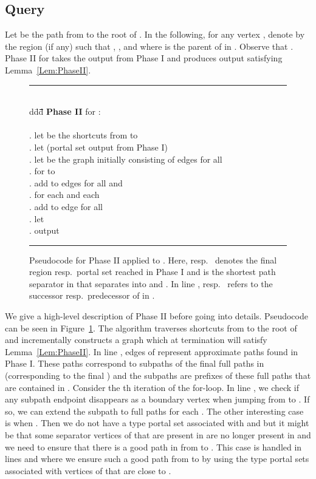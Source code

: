 \documentclass[11pt]{article}
\begin{document}
\subsection{Query}
Let  be the path from  to the root  of . In the following, for any vertex , denote by  the region (if any) such that , , and  where  is the parent of  in . Observe that . Phase II for  takes the output from Phase I and produces output satisfying Lemma~\ref{Lem:PhaseII}.
\begin{figure}[!ht]
\begin{tabbing}
\rule{\linewidth}{\arrayrulewidth}\\
d\=dd\=\quad\=\quad\=\quad\=\quad\=\quad\=\quad\=\quad\=\quad\=\quad\=\quad\=\quad\=\kill
\>\textbf{Phase II} for :\\\\
. \>\>let  be the shortcuts from  to \\
. \>\>let  (portal set output from Phase I)\\
. \>\>let  be the graph initially consisting of edges  for all \\
. \>\>for  to \\
. \>\>\>add to  edges  for all  and \\
. \>\>\>for each  and each \\
. \>\>\>\>add to  edge  for all \\
. \>\>\>let \\
. \>\>output \\
\rule{\linewidth}{\arrayrulewidth}
\end{tabbing}
\caption{Pseudocode for Phase II applied to . Here,  resp.~ denotes the final region resp.~portal set reached in Phase I and  is the shortest path separator in  that separates  into  and . In line ,  resp.~ refers to the successor resp.~predecessor of  in .}\label{fig:PhaseII}
\end{figure}
We give a high-level description of Phase II before going into details.  Pseudocode can be seen in Figure~\ref{fig:PhaseII}. The algorithm traverses shortcuts  from  to the root  of  and incrementally constructs a graph  which at termination will satisfy Lemma~\ref{Lem:PhaseII}. In line , edges of  represent approximate paths found in Phase I. These paths correspond to subpaths of the final full paths in  (corresponding to the final ) and the subpaths are prefixes of these full paths that are contained in . Consider the th iteration of the for-loop. In line , we check if any subpath endpoint  disappears as a boundary vertex when jumping from  to . If so, we can extend the subpath to full paths  for each . The other interesting case is when . Then we do not have a type  portal set associated with  and  but it might be that some separator vertices  of  that are present in  are no longer present in  and we need to ensure that there is a good path in  from  to . This case is handled in lines  and  where we ensure such a good path from  to  by using the type  portal sets associated with vertices of  that are close to .
\end{document}
